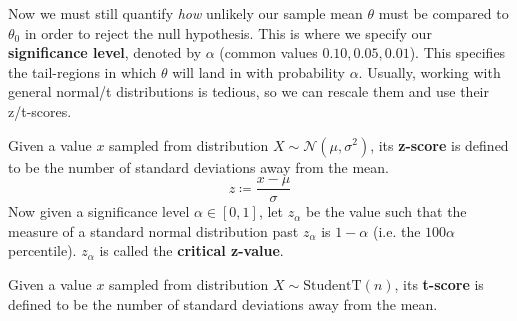 \documentclass{article}
\begin{document}
    Now we must still quantify \textit{how} unlikely our sample mean $\theta$ must be compared to $\theta_0$ in order to reject the null hypothesis. This is where we specify our \textbf{significance level}, denoted by $\alpha$ (common values $0.10, 0.05, 0.01$). This specifies the tail-regions in which $\theta$ will land in with probability $\alpha$. Usually, working with general normal/t distributions is tedious, so we can rescale them and use their z/t-scores. 

    \begin{definition}[Z-score]
      Given a value $x$ sampled from distribution $X \sim \mathcal{N}(\mu, \sigma^2)$, its \textbf{z-score} is defined to be the number of standard deviations away from the mean. 
      \begin{equation}
        z \coloneqq \frac{x - \mu}{\sigma}
      \end{equation}
      Now given a significance level $\alpha \in [0, 1]$, let $z_\alpha$ be the value such that the measure of a standard normal distribution past $z_\alpha$ is $1 - \alpha$ (i.e. the $100\alpha$ percentile). $z_\alpha$ is called the \textbf{critical z-value}.
    \end{definition}

    \begin{definition}[T-score]
      Given a value $x$ sampled from distribution $X \sim \mathrm{StudentT}(n)$, its \textbf{t-score} is defined to be the number of standard deviations away from the mean. 
    \end{definition}
\end{document}
